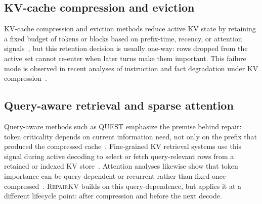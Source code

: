 \documentclass{article}
\newcommand{\repairkv}{\textsc{RepairKV}}
\begin{document}
\subsection{KV-cache compression and eviction}
{\color{red}KV-cache compression and eviction methods reduce active KV state by retaining a fixed budget of tokens or blocks based on prefix-time, recency, or attention signals~\citep{snapkv,streamingllm,h2o,scissorhands,pyramidkv}}, but this retention decision is usually one-way: rows dropped from the active set cannot re-enter when later turns make them important. This failure mode is observed in recent analyses of instruction and fact degradation under KV compression~\citep{pitfalls}.

\subsection{Query-aware retrieval and sparse attention}
Query-aware methods such as QUEST {\color{red}emphasize the premise behind repair: token criticality depends on current information need, not only on the prefix that produced the compressed cache~\citep{quest}}. Fine-grained KV retrieval systems use this signal during active decoding to select or fetch query-relevant rows from a retained or indexed KV store~\citep{quest,fier,pariskv,shadowkv}. Attention analyses likewise show that token importance can be query-dependent or recurrent rather than fixed once compressed~\citep{retrieval_heads,lazy_eviction}. {\color{red}\repairkv{} builds on this query-dependence, but applies it at a different lifecycle point: after compression and before the next decode.}
\end{document}
